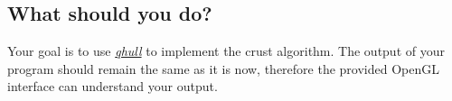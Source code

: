 \documentclass[11pt]{article}
\begin{document}
\subsection{What should  you do?}

Your goal is to use \href{http://www.qhull.org/}{\it qhull} to implement the crust algorithm.
The output of your program should remain the same as it is now, therefore
the provided OpenGL interface can understand your output.



%



\end{document}
